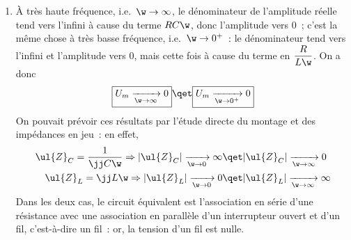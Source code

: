 \documentclass[a4paper, 12pt, final, garamond]{book}
\begin{document}
\begin{enumerate}
    \item À très haute fréquence, i.e.\ $\w\rightarrow\infty$, le dénominateur
        de l'amplitude réelle tend vers l'infini à cause du terme $RC\w$, donc
        l'amplitude vers 0~; c'est la même chose à très basse fréquence, i.e.\
        $\w\rightarrow0^+$~: le dénominateur tend vers l'infini et l'amplitude
        vers 0, mais cette fois à cause du terme en $\dfrac{R}{L\w}$. On a donc
        \[
            \boxed{U_m \xrightarrow[\w\rightarrow\infty]{} 0}
            \qet
            \boxed{U_m \xrightarrow[\w\rightarrow0^+]{} 0}
        \]
        On pouvait prévoir ces résultats par l'étude directe du montage et des
        impédances en jeu~: en effet,
        \begin{align*}
            \ul{Z}_C
                = \frac{1}{\jj C\w}
            \Rightarrow
            |\ul{Z}_C| \xrightarrow[\w\rightarrow0]{} \infty
            &\qet
            |\ul{Z}_C| \xrightarrow[\w\rightarrow\infty]{} 0\\
            \ul{Z}_L
                = \jj L\w
            \Rightarrow
            |\ul{Z}_L| \xrightarrow[\w\rightarrow0]{} 0
            &\qet
            |\ul{Z}_L| \xrightarrow[\w\rightarrow\infty]{} \infty
        \end{align*}
        Dans les deux cas, le circuit équivalent est l'association en série
        d'une résistance avec une association en parallèle d'un interrupteur
        ouvert et d'un fil, c'est-à-dire un fil~: or, la tension d'un fil est
        nulle.
\end{enumerate}
\end{document}
